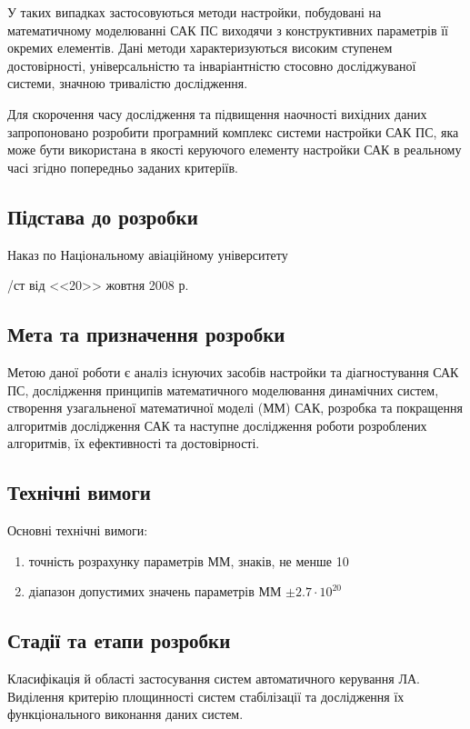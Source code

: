 \documentclass[ukrainian,utf8]{eskdtext}
\begin{document}
У таких випадках застосовуються методи настройки, побудовані на 
математичному моделюванні САК ПС виходячи з конструктивних 
параметрів її окремих елементів. Дані методи характеризуються високим 
ступенем достовірності, універсальністю та інваріантністю стосовно 
досліджуваної системи, значною тривалістю дослідження. 

Для скорочення часу дослідження та підвищення наочності вихідних даних 
запропоновано розробити програмний комплекс системи настройки САК ПС, 
яка може бути використана в якості керуючого елементу настройки САК в 
реальному часі згідно попередньо заданих критеріїв.

\subsection*{Підстава до розробки}

Наказ по Національному авіаційному університету

/ст від <<20>> жовтня 2008 р.

\subsection*{Мета та призначення розробки}

Метою даної роботи є аналіз існуючих засобів настройки та діагностування 
САК ПС, дослідження принципів математичного моделювання динамічних систем, 
створення узагальненої математичної моделі (ММ) САК, розробка та 
покращення алгоритмів дослідження САК та наступне дослідження роботи 
розроблених алгоритмів, їх ефективності та достовірності.

\subsection*{Технічні вимоги}

Основні технічні вимоги:
\begin{enumerate}
 \item точність розрахунку параметрів ММ, знаків, не менше \hfill 10
 \item діапазон допустимих значень параметрів ММ \hfill $\pm2.7\cdot10^{20}$
\end{enumerate}

\subsection*{Стадії та етапи розробки}

Класифікація й області застосування систем автоматичного керування ЛА. 
Виділення критерію площинності систем стабілізації та дослідження їх 
функціонального виконання даних систем.
\end{document}
